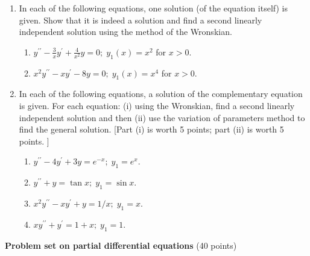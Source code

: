 \documentclass[fleqn]{article}
\begin{document}
\begin{enumerate}
\begin{enumerate}
      \end{enumerate}
    
    
    \item In each of the following equations, one solution (of the equation itself) is given. Show that it is indeed a solution and find a second linearly independent solution using the method of the Wronskian. 
      \begin{enumerate}
      \item $y^{\prime \prime }-\frac{\textstyle 3}{\textstyle x}y^{\prime }+\frac{\textstyle 4}{\textstyle x^{2}} y=0;\;y_{1}\left( x\right) =x^{2}$ for $x>0.$
      
      \item $x^{2}y^{\prime \prime }-xy^{\prime }-8y=0;\;y_{1}\left( x\right) =x^{4}$ for $x>0.$
      \end{enumerate}
    
    
    \item In each of the following equations, a solution of the complementary equation is given. For each equation: (i) using the Wronskian, find a second linearly independent solution and then (ii) use the variation of parameters method to find the general solution. [Part (i) is worth 5 points; part (ii) is worth 5 points.  ]
      \begin{enumerate}
      \item $y^{\prime \prime }-4y^{\prime }+3y=e^{-x};\;y_{1}=e^{x}.$
      
      \item $y^{\prime \prime }+y=\tan x;\;y_{1}=\sin x.$
      
      \item $x^{2}y^{\prime \prime }-xy^{\prime }+y=1/x;\;y_{1}=x.$
      
      \item $xy^{\prime \prime }+y^{\prime }=1+x;\;y_{1}=1.$
      \end{enumerate}

    
  \end{enumerate}

  \pagebreak


  \textbf{Problem set on partial differential equations} (40 points)
\end{document}
